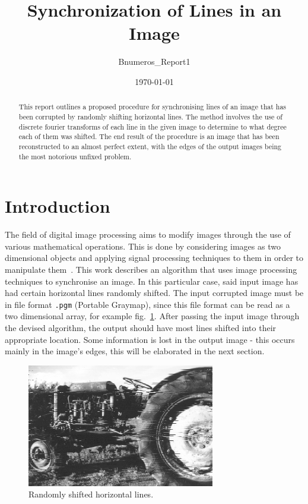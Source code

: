 \documentclass[a4paper,12pt]{article}
\title{Synchronization of Lines in an Image}
\author{Bnumeros\_Report1}
\date{\today}
\begin{document}
\maketitle

\begin{abstract}
 This report outlines a proposed procedure for synchronising lines of an image that has been corrupted by randomly shifting horizontal lines. The method involves the use of discrete fourier transforms of each line in the given image to determine to what degree each of them was shifted. The end result of the procedure is an image that has been reconstructed to an almost perfect extent, with the edges of the output images being the most notorious unfixed problem.
\end{abstract}

\section{Introduction}

The field of digital image processing aims to modify images through the use of various mathematical operations. This is done by considering images as two dimensional objects and applying signal processing techniques to them in order to manipulate them~\cite{gonzalez1992digital}. This work describes an algorithm that uses image processing techniques to synchronise an image. In this particular case, said input image has had certain horizontal lines randomly shifted. The input corrupted image must be in file format \texttt{.pgm} (Portable Graymap), since this file format can be read as a two dimensional array, for example fig.~\ref{fig.1}. After passing the input image through the devised algorithm, the output should have most lines shifted into their appropriate location. Some information is lost in the output image - this occurs mainly in the image's edges, this will be elaborated in the next section.

\begin{figure}[h!]
\centering
\includegraphics[width=0.73\textwidth]{img/desync2}
\caption{Randomly shifted horizontal lines.}
\label{fig.1}
\end{figure}
\end{document}

